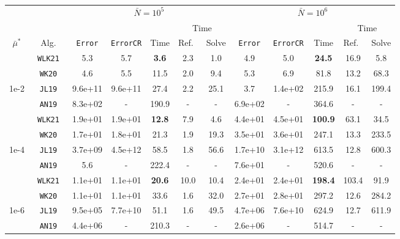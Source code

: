 \begin{tabular}{ccccccc|ccccc}%
\toprule
& & \multicolumn{5}{c}{$\bar N = 10^5$} & \multicolumn{5}{c}{$\bar N = 10^6$} \\
\cmidrule(lr){3-7} \cmidrule(lr){8-12}
& & & & & \multicolumn{2}{c}{Time} & & & & \multicolumn{2}{c}{Time} \\
\cmidrule(lr){6-7} \cmidrule(lr){11-12}
$\bar\mu^*$   & Alg.        & \texttt{Error} & \texttt{ErrorCR} & Time      & Ref.\ & Solve & \texttt{Error} & \texttt{ErrorCR} & Time     & Ref.\  & Solve \\
\midrule
& \texttt{ WLK21 }&  5.3&  5.7& \textbf{ 3.6 }&  2.3&  1.0&  4.9&  5.0& \textbf{ 24.5 }&  16.9&  5.8 \\
& \texttt{ WK20 }&  4.6&  5.5&  11.5&  2.0&  9.4&  5.3&  6.9&  81.8&  13.2&  68.3 \\
1e-2& \texttt{ JL19 }&  9.6e+11&  9.6e+11&  27.4&  2.2&  25.1&  3.7&  1.4e+02&  215.9&  16.1&  199.4 \\
& \texttt{ AN19 }&  8.3e+02& -&  190.9& -& -&  6.9e+02& -&  364.6& -& - \\
\midrule
& \texttt{ WLK21 }&  1.9e+01&  1.9e+01& \textbf{ 12.8 }&  7.9&  4.6&  4.4e+01&  4.5e+01& \textbf{ 100.9 }&  63.1&  34.5 \\
& \texttt{ WK20 }&  1.7e+01&  1.8e+01&  21.3&  1.9&  19.3&  3.5e+01&  3.6e+01&  247.1&  13.3&  233.5 \\
1e-4& \texttt{ JL19 }&  3.7e+09&  4.5e+12&  58.5&  1.8&  56.6&  1.7e+10&  3.1e+12&  613.5&  12.8&  600.3 \\
& \texttt{ AN19 }&  5.6& -&  222.4& -& -&  7.6e+01& -&  520.6& -& - \\
\midrule
& \texttt{ WLK21 }&  1.1e+01&  1.1e+01& \textbf{ 20.6 }&  10.0&  10.4&  2.4e+01&  2.4e+01& \textbf{ 198.4 }&  103.4&  91.9 \\
& \texttt{ WK20 }&  1.1e+01&  1.1e+01&  33.6&  1.6&  32.0&  2.7e+01&  2.8e+01&  297.2&  12.6&  284.2 \\
1e-6& \texttt{ JL19 }&  9.5e+05&  7.7e+10&  51.1&  1.6&  49.5&  4.7e+06&  7.6e+10&  624.9&  12.7&  611.9 \\
& \texttt{ AN19 }&  4.4e+06& -&  210.3& -& -&  2.6e+06& -&  514.7& -& - \\
\bottomrule
\end{tabular}
